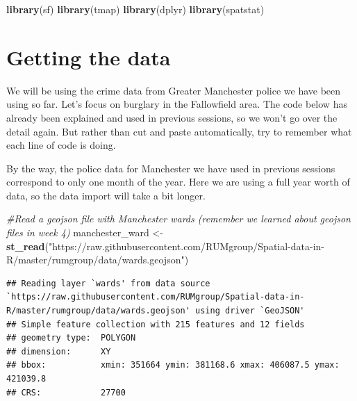 \documentclass[]{book}
\newenvironment{Shaded}{\begin{snugshade}}{\end{snugshade}}
\newcommand{\CommentTok}[1]{\textcolor[rgb]{0.56,0.35,0.01}{\textit{#1}}}
\newcommand{\KeywordTok}[1]{\textcolor[rgb]{0.13,0.29,0.53}{\textbf{#1}}}
\newcommand{\NormalTok}[1]{#1}
\newcommand{\StringTok}[1]{\textcolor[rgb]{0.31,0.60,0.02}{#1}}
\begin{document}
\begin{Shaded}
\begin{Highlighting}[]
\KeywordTok{library}\NormalTok{(sf)}
\KeywordTok{library}\NormalTok{(tmap)}
\KeywordTok{library}\NormalTok{(dplyr)}
\KeywordTok{library}\NormalTok{(spatstat)}
\end{Highlighting}
\end{Shaded}

\hypertarget{getting-the-data}{%
\section{Getting the data}\label{getting-the-data}}

We will be using the crime data from Greater Manchester police we have been using so far. Let's focus on burglary in the Fallowfield area. The code below has already been explained and used in previous sessions, so we won't go over the detail again. But rather than cut and paste automatically, try to remember what each line of code is doing.

By the way, the police data for Manchester we have used in previous sessions correspond to only one month of the year. Here we are using a full year worth of data, so the data import will take a bit longer.

\begin{Shaded}
\begin{Highlighting}[]
\CommentTok{#Read a geojson file with Manchester wards (remember we learned about geojson files in week 4)}
\NormalTok{manchester_ward <-}\StringTok{ }\KeywordTok{st_read}\NormalTok{(}\StringTok{"https://raw.githubusercontent.com/RUMgroup/Spatial-data-in-R/master/rumgroup/data/wards.geojson"}\NormalTok{)}
\end{Highlighting}
\end{Shaded}

\begin{verbatim}
## Reading layer `wards' from data source `https://raw.githubusercontent.com/RUMgroup/Spatial-data-in-R/master/rumgroup/data/wards.geojson' using driver `GeoJSON'
## Simple feature collection with 215 features and 12 fields
## geometry type:  POLYGON
## dimension:      XY
## bbox:           xmin: 351664 ymin: 381168.6 xmax: 406087.5 ymax: 421039.8
## CRS:            27700
\end{verbatim}
\end{document}
